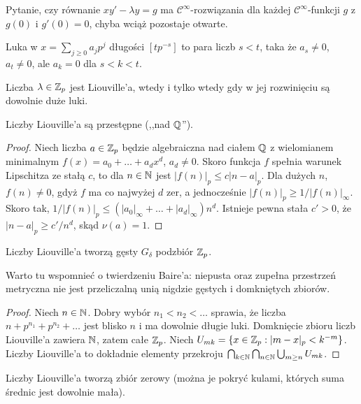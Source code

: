 Pytanie, czy równanie $xy' - \lambda y = g$ ma $\mathcal C^\infty$-rozwiązania dla każdej $\mathcal C^\infty$-funkcji $g$ z $g(0)$ i $g'(0) = 0$, chyba wciąż pozostaje otwarte.

\begin{definicja}
	Luka w $x = \sum_{j \ge 0} a_jp^j$ długości $[tp^{-s}]$ to para liczb $s < t$, taka że $a_s \neq 0$, $a_t \neq 0$, ale $a_k = 0$ dla $s < k < t$.
\end{definicja}

\begin{fakt}
	Liczba $\lambda \in \mathbb Z_p$ jest Liouville'a, wtedy i tylko wtedy gdy w jej rozwinięciu są dowolnie duże luki.
\end{fakt}

\begin{fakt}
	Liczby Liouville'a są przestępne (,,nad $\mathbb Q$'').
\end{fakt}

\begin{proof}
	Niech liczba $a \in \mathbb Z_p$ będzie algebraiczna nad ciałem $\mathbb Q$ z wielomianem minimalnym $f(x) = a_0 + \ldots + a_d x^d$, $a_d \neq 0$.
	Skoro funkcja $f$ spełnia warunek Lipschitza ze stałą $c$, to dla $n \in \mathbb N$ jest $|f(n)|_p \le c|n-a|_p$.
	Dla dużych $n$, $f(n) \neq 0$, gdyż $f$ ma co najwyżej $d$ zer, a jednocześnie $|f(n)|_p \ge 1/|f(n)|_\infty$.
	Skoro tak, $1/ |f(n)|_p \le (|a_0|_\infty + \ldots + |a_d|_\infty) n^d$.
	Istnieje pewna stała $c' > 0$, że $|n - a|_p \ge c' / n^{d}$, skąd $\nu(a) = 1$.
\end{proof}

\begin{fakt}
	Liczby Liouville'a tworzą gęsty $G_\delta$ podzbiór $\mathbb Z_p$.
\end{fakt}

Warto tu wspomnieć o twierdzeniu Baire'a: niepusta oraz zupełna przestrzeń metryczna nie jest przeliczalną unią nigdzie gęstych i domkniętych zbiorów.

\begin{proof}
	Niech $n \in \mathbb N$.
	Dobry wybór $n_1 < n_2 < \ldots$ sprawia, że liczba $n + p^{n_1} + p^{n_2} + \ldots$ jest blisko $n$ i ma dowolnie długie luki.
	Domknięcie zbioru liczb Liouville'a zawiera $\mathbb N$, zatem całe $\mathbb Z_p$.
	Niech $U_{mk} = \{x \in \mathbb Z_p : |m-x|_p < k^{-m}\}$.
	Liczby Liouville'a to dokładnie elementy przekroju $\bigcap_{k \in \mathbb N} \bigcap_{n \in \mathbb N} \bigcup_{m \ge n} U_{mk}$.
\end{proof}

\begin{fakt}
	Liczby Liouville'a tworzą zbiór zerowy (można je pokryć kulami, których suma średnic jest dowolnie mała).
\end{fakt}

